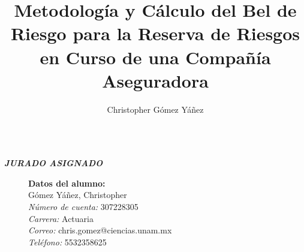 \documentclass[11pt,twoside,openright,spanish]{report}
\numberwithin{equation}{chapter}
\numberwithin{figure}{chapter}
\numberwithin{table}{chapter}
\renewcommand{\baselinestretch}{1.5}
\newenvironment{changemargin}[3]{
	\begin{list}{}{
			\setlength{\topsep}{#3}
			\setlength{\leftmargin}{#1}
			\setlength{\rightmargin}{#2}
			\setlength{\listparindent}{\parindent}
			\setlength{\itemindent}{\parindent}
			\setlength{\parsep}{\parskip}
		}
		\item[]}{\end{list}}
\begin{document}
	
	\renewcommand{\baselinestretch}{1}
	
	\graphicspath{{./Imagenes/}}
	
	\title{Metodología y Cálculo del Bel de Riesgo para la Reserva de Riesgos en Curso de una Compañía Aseguradora}
	\author{Christopher Gómez Yáñez}
	\maketitle
	
	\newpage
	$\ $
	\thispagestyle{empty} %
	
	\begin{changemargin}{1cm}{0cm}{1cm}
		
		\vspace{30cm} 
		\begin{center}
			\textit{\textbf{\Large JURADO ASIGNADO}}
		\end{center}
		\vspace{1cm}
		 
		\begin{description}
			\item[]\textbf{Datos del alumno:}\\
			Gómez Yáñez, Christopher\\
			\textit{Número de cuenta:} 307228305\\
			\textit{Carrera:} Actuaria\\
			\textit{Correo:} chris.gomez@ciencias.unam.mx\\
			\textit{Teléfono:} 5532358625
			

\end{description}
\end{changemargin}
\end{document}
